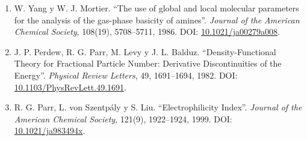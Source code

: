 \begin{enumerate}
\item\label{anexo-ref-7} W. Yang y W. J. Mortier. ``The use of global and local molecular parameters for the analysis of the gas-phase basicity of amines''. \textit{Journal of the American Chemical Society}, 108(19), 5708--5711, 1986. DOI: \href{https://doi.org/10.1021/ja00279a008}{10.1021/ja00279a008}.

\item\label{anexo-ref-8} J. P. Perdew, R. G. Parr, M. Levy y J. L. Balduz. ``Density-Functional Theory for Fractional Particle Number: Derivative Discontinuities of the Energy''. \textit{Physical Review Letters}, 49, 1691--1694, 1982. DOI: \href{https://doi.org/10.1103/PhysRevLett.49.1691}{10.1103/PhysRevLett.49.1691}.

\item\label{anexo-ref-9} R. G. Parr, L. von Szentpály y S. Liu. ``Electrophilicity Index''. \textit{Journal of the American Chemical Society}, 121(9), 1922--1924, 1999. DOI: \href{https://doi.org/10.1021/ja983494x}{10.1021/ja983494x}.

\end{enumerate}
\endgroup